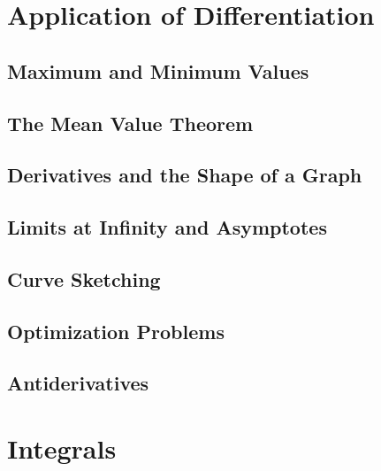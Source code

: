\documentclass[]{book}
\theoremstyle{definition}
\theoremstyle{definition}
\theoremstyle{definition}
\theoremstyle{remark}
\begin{document}
\hypertarget{application-of-differentiation}{%
\chapter{Application of Differentiation}\label{application-of-differentiation}}

\hypertarget{maximum-and-minimum-values}{%
\section{Maximum and Minimum Values}\label{maximum-and-minimum-values}}

\hypertarget{the-mean-value-theorem}{%
\section{The Mean Value Theorem}\label{the-mean-value-theorem}}

\hypertarget{derivatives-and-the-shape-of-a-graph}{%
\section{Derivatives and the Shape of a Graph}\label{derivatives-and-the-shape-of-a-graph}}

\hypertarget{limits-at-infinity-and-asymptotes}{%
\section{Limits at Infinity and Asymptotes}\label{limits-at-infinity-and-asymptotes}}

\hypertarget{curve-sketching}{%
\section{Curve Sketching}\label{curve-sketching}}

\hypertarget{optimization-problems}{%
\section{Optimization Problems}\label{optimization-problems}}

\hypertarget{antiderivatives}{%
\section{Antiderivatives}\label{antiderivatives}}

\hypertarget{integrals}{%
\chapter{Integrals}\label{integrals}}
\end{document}
